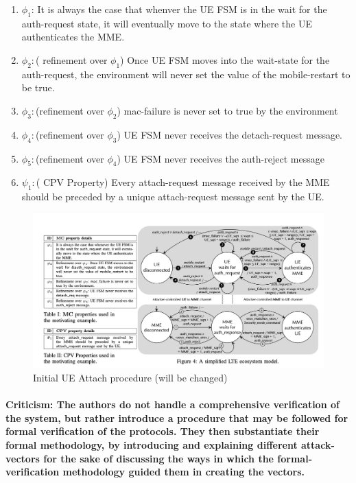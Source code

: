 \documentclass[acmsmall,review,authorversion]{acmart}
\begin{document}
\begin{enumerate}
\item $\phi_1$: It is always the case that whenver the UE FSM is in the wait for the auth-request state, it will eventually move to the state where the UE authenticates the MME. 
\item $\phi_2:$( refinement over $\phi_1$) Once UE FSM moves into the wait-state for the auth-request, the environment will never set the value of the mobile-restart to be true. 
\item $\phi_3:$(refinement over $\phi_2$) mac-failure is never set to true by the environment
\item $\phi_4:$(refinement over $\phi_3$) UE FSM never receives the detach-request message. 
\item $\phi_5 :$(refinement over $\phi_4$) UE FSM never receives the auth-reject message
\item $\psi_1 :$( CPV Property) Every attach-request message received by the MME should be preceded by a unique attach-request message sent by the UE. 
\end{enumerate}

\begin{figure}[H]
    \begin{center}
        \includegraphics[width=0.7 \columnwidth]{./images/LTEInspector} 
    \end{center}
    \caption{Initial UE Attach procedure (will be changed)}
    \label{fig:inital-ue-attach}
\end{figure}

\paragraph{Criticism: The authors do not handle a comprehensive verification of the system, but rather introduce a procedure that may be followed for formal verification of the protocols. They then substantiate their formal methodology, by introducing and explaining different attack-vectors for the sake of discussing the ways in which the formal-verification methodology guided them in creating the vectors. 
}
\end{document}
